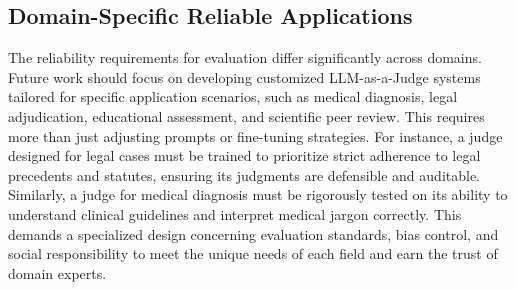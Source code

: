\documentclass[acmsmall,screen]{acmart}
\begin{document}
\subsection{Domain-Specific Reliable Applications}\label{subsec:future_domain}

The reliability requirements for evaluation differ significantly across domains. Future work should focus on developing customized LLM-as-a-Judge systems tailored for specific application scenarios, such as medical diagnosis, legal adjudication, educational assessment, and scientific peer review. This requires more than just adjusting prompts or fine-tuning strategies. For instance, a judge designed for legal cases must be trained to prioritize strict adherence to legal precedents and statutes, ensuring its judgments are defensible and auditable. Similarly, a judge for medical diagnosis must be rigorously tested on its ability to understand clinical guidelines and interpret medical jargon correctly. This demands a specialized design concerning evaluation standards, bias control, and social responsibility to meet the unique needs of each field and earn the trust of domain experts.





\end{document}
